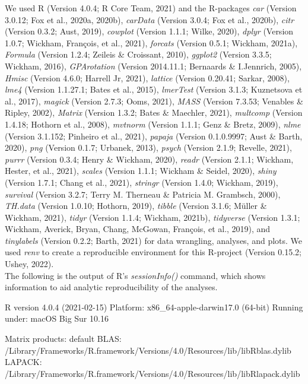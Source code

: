 \documentclass[
  english,
  man,floatsintext]{apa7}
\begin{document}
We used R (Version 4.0.4; R Core Team, 2021) and the R-packages \emph{car} (Version 3.0.12; Fox et al., 2020a, 2020b), \emph{carData} (Version 3.0.4; Fox et al., 2020b), \emph{citr} (Version 0.3.2; Aust, 2019), \emph{cowplot} (Version 1.1.1; Wilke, 2020), \emph{dplyr} (Version 1.0.7; Wickham, François, et al., 2021), \emph{forcats} (Version 0.5.1; Wickham, 2021a), \emph{Formula} (Version 1.2.4; Zeileis \& Croissant, 2010), \emph{ggplot2} (Version 3.3.5; Wickham, 2016), \emph{GPArotation} (Version 2014.11.1; Bernaards \& I.Jennrich, 2005), \emph{Hmisc} (Version 4.6.0; Harrell Jr, 2021), \emph{lattice} (Version 0.20.41; Sarkar, 2008), \emph{lme4} (Version 1.1.27.1; Bates et al., 2015), \emph{lmerTest} (Version 3.1.3; Kuznetsova et al., 2017), \emph{magick} (Version 2.7.3; Ooms, 2021), \emph{MASS} (Version 7.3.53; Venables \& Ripley, 2002), \emph{Matrix} (Version 1.3.2; Bates \& Maechler, 2021), \emph{multcomp} (Version 1.4.18; Hothorn et al., 2008), \emph{mvtnorm} (Version 1.1.1; Genz \& Bretz, 2009), \emph{nlme} (Version 3.1.152; Pinheiro et al., 2021), \emph{papaja} (Version 0.1.0.9997; Aust \& Barth, 2020), \emph{png} (Version 0.1.7; Urbanek, 2013), \emph{psych} (Version 2.1.9; Revelle, 2021), \emph{purrr} (Version 0.3.4; Henry \& Wickham, 2020), \emph{readr} (Version 2.1.1; Wickham, Hester, et al., 2021), \emph{scales} (Version 1.1.1; Wickham \& Seidel, 2020), \emph{shiny} (Version 1.7.1; Chang et al., 2021), \emph{stringr} (Version 1.4.0; Wickham, 2019), \emph{survival} (Version 3.2.7; Terry M. Therneau \& Patricia M. Grambsch, 2000), \emph{TH.data} (Version 1.0.10; Hothorn, 2019), \emph{tibble} (Version 3.1.6; Müller \& Wickham, 2021), \emph{tidyr} (Version 1.1.4; Wickham, 2021b), \emph{tidyverse} (Version 1.3.1; Wickham, Averick, Bryan, Chang, McGowan, François, et al., 2019), and \emph{tinylabels} (Version 0.2.2; Barth, 2021) for data wrangling, analyses, and plots. We used \emph{renv} to create a reproducible environment for this R-project (Version 0.15.2; Ushey, 2022).\\
The following is the output of R's \emph{sessionInfo()} command, which shows information to aid analytic reproducibility of the analyses.

R version 4.0.4 (2021-02-15)
Platform: x86\_64-apple-darwin17.0 (64-bit)
Running under: macOS Big Sur 10.16

Matrix products: default
BLAS: /Library/Frameworks/R.framework/Versions/4.0/Resources/lib/libRblas.dylib
LAPACK: /Library/Frameworks/R.framework/Versions/4.0/Resources/lib/libRlapack.dylib
\end{document}
